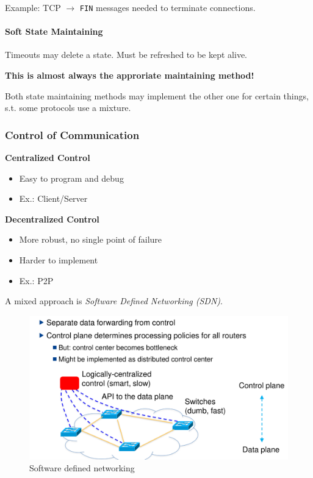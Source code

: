 \documentclass[english]{panikzettel}
\newcommand{\alert}[1]{\textbf{\textcolor{red!75!black}{#1}}}
\begin{document}
	Example: TCP \( \rightarrow \) \texttt{FIN} messages needed to terminate connections.

	\paragraph{Soft State Maintaining}
	\label{pgf-soft-state-maintaining}
	
	Timeouts may delete a state. 
	Must be refreshed to be kept alive.

	\alert{This is almost always the approriate maintaining method!}

	Both state maintaining methods may implement the other one for certain things, s.t. some protocols use a mixture.

	\subsubsection{Control of Communication}
	\label{sss-control-of-communication}
	
	\begin{halfboxl}
		\textbf{Centralized Control}
		\begin{itemize}
			\item Easy to program and debug
			\item Ex.: Client/Server 
		\end{itemize}
	\end{halfboxl}%
	\begin{halfboxr}
		\vspace{-\baselineskip}
		\textbf{Decentralized Control}
		\begin{itemize}
			\item More robust, no single point of failure
			\item Harder to implement
			\item Ex.: P2P
		\end{itemize}
	\end{halfboxr}
	
	A mixed approach is \textit{Software Defined Networking (SDN)}.

	\begin{figure}[H]
		\centering
		\includegraphics[width=\textwidth]{img/2-sdn.png}
		\caption{Software defined networking}
		\label{img-2-sdn}
	\end{figure}
\end{document}
